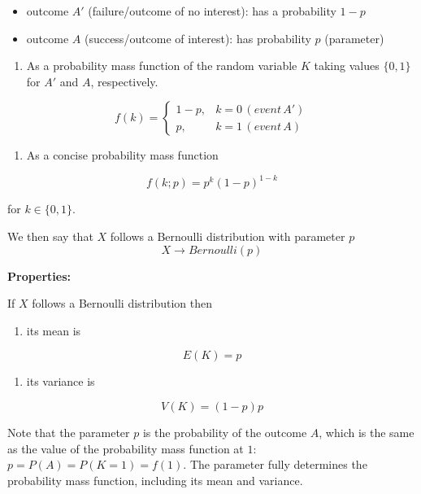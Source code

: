 \documentclass[
]{book}
\providecommand{\tightlist}{%
  \setlength{\itemsep}{0pt}\setlength{\parskip}{0pt}}
\begin{document}
\begin{itemize}
\tightlist
\item
  outcome \(A'\) (failure/outcome of no interest): has a probability \(1-p\)
\item
  outcome \(A\) (success/outcome of interest): has probability \(p\) (parameter)
\end{itemize}

\begin{enumerate}
\def\labelenumi{\arabic{enumi})}
\setcounter{enumi}{1}
\tightlist
\item
  As a probability mass function of the random variable \(K\) taking values \(\{0, 1\}\) for \(A'\) and \(A\), respectively.
\end{enumerate}

\[
    f(k)= 
\begin{cases}
    1-p,&  k=0\, (event\, A')\\
    p,& k=1\, (event\, A) 
\end{cases}
\]

\begin{enumerate}
\def\labelenumi{\arabic{enumi})}
\setcounter{enumi}{2}
\tightlist
\item
  As a concise probability mass function
\end{enumerate}

\[f(k; p)=p^k(1-p)^{1-k} \]

for \(k\in\{0,1\}\).

We then say that \(X\) follows a Bernoulli distribution with parameter \(p\)
\[X \rightarrow Bernoulli(p)\]

\textbf{Properties:}

If \(X\) follows a Bernoulli distribution then

\begin{enumerate}
\def\labelenumi{\arabic{enumi})}
\tightlist
\item
  its mean is
\end{enumerate}

\[E(K)=p\]

\begin{enumerate}
\def\labelenumi{\arabic{enumi})}
\setcounter{enumi}{1}
\tightlist
\item
  its variance is
\end{enumerate}

\[V(K)=(1-p)p\]

Note that the parameter \(p\) is the probability of the outcome \(A\),
which is the same as the value of the probability mass function at \(1\): \(p=P(A)=P(K=1)=f(1)\). The parameter fully determines the probability mass function, including its mean and variance.
\end{document}
